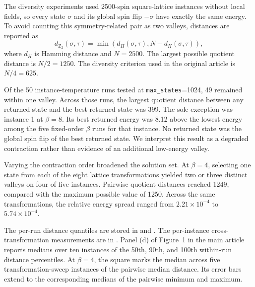 The diversity experiments used 2500-spin square-lattice instances without local
fields, so every state $\sigma$ and its global spin flip $-\sigma$ have exactly
the same energy. To avoid counting this symmetry-related pair as two valleys,
distances are reported as
\[
    d_{\mathbb{Z}_2}(\sigma,\tau)
    = \min\!\left(d_H(\sigma,\tau),N-d_H(\sigma,\tau)\right),
\]
where $d_H$ is Hamming distance and $N=2500$. The largest possible quotient
distance is $N/2=1250$. The diversity criterion used in the original article is
$N/4=625$.

Of the 50 instance-temperature runs tested at \texttt{max\_states}=1024, 49
remained within one valley. Across those runs, the largest quotient distance
between any returned state and the best returned state was 399. The sole
exception was instance 1 at $\beta=8$. Its best returned energy was 8.12 above
the lowest energy among the five fixed-order $\beta$ runs for that instance. No
returned state was the global spin flip of the best returned state. We interpret
this result as a degraded contraction rather than evidence of an additional
low-energy valley.

Varying the contraction order broadened the solution set. At $\beta=4$,
selecting one state from each of the eight lattice transformations yielded two
or three distinct valleys on four of five instances. Pairwise quotient distances
reached 1249, compared with the maximum possible value of 1250. Across the same
transformations, the relative energy spread ranged from $2.21\times10^{-4}$ to
$5.74\times10^{-4}$.

The per-run distance quantiles are stored in  and
. The per-instance cross-transformation measurements
are in . Panel (d) of Figure~1 in the main article
reports medians over ten instances of the 50th, 90th, and 100th within-run
distance percentiles. At $\beta=4$, the square marks the median across five
transformation-sweep instances of the pairwise median distance. Its error bars
extend to the corresponding medians of the pairwise minimum and maximum.

